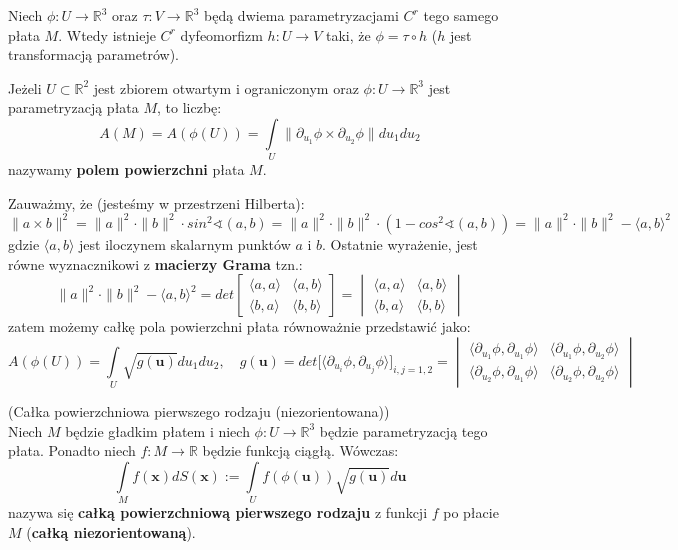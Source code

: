 \begin{tw}
	Niech $\phi:U\rightarrow\mathbb{R}^3$ oraz $\tau:V\rightarrow\mathbb{R}^3$ będą dwiema parametryzacjami $C^r$ tego samego płata $M$. Wtedy istnieje $C^r$ dyfeomorfizm $h:U\rightarrow V$ taki, że $\phi=\tau\circ h$ ($h$ jest transformacją parametrów).
\end{tw}

\begin{df}
	Jeżeli $U\subset\mathbb{R}^2$ jest zbiorem otwartym i ograniczonym oraz $\phi:U\rightarrow\mathbb{R}^3$ jest parametryzacją płata $M$, to liczbę: $$A(M)=A(\phi(U))=\int\limits_U\|\partial_{u_1}\phi\times\partial_{u_2}\phi\|du_1du_2$$ nazywamy \textbf{polem powierzchni} płata $M$.
\end{df}

\begin{uwg}
	Zauważmy, że (jesteśmy w przestrzeni Hilberta): $$\|a\times b\|^2=\|a\|^2\cdot\|b\|^2\cdot sin^2\sphericalangle(a,b)=\|a\|^2\cdot\|b\|^2\cdot(1-cos^2\sphericalangle(a,b))=\|a\|^2\cdot\|b\|^2-\langle a,b\rangle^2$$ gdzie $\langle a,b\rangle$ jest iloczynem skalarnym punktów $a$ i $b$. Ostatnie wyrażenie, jest równe wyznacznikowi z \textbf{macierzy Grama} tzn.: 
	$$\|a\|^2\cdot\|b\|^2-\langle a,b\rangle^2=det\begin{bmatrix}
	\langle a,a\rangle & \langle a,b\rangle \\
	\langle b,a\rangle & \langle b,b\rangle \end{bmatrix}=
	\begin{vmatrix}
	\langle a,a\rangle & \langle a,b\rangle \\
	\langle b,a\rangle & \langle b,b\rangle \end{vmatrix}$$
	zatem możemy całkę pola powierzchni płata równoważnie przedstawić jako:
	$$A(\phi(U))=\int\limits_U\sqrt{g(\textbf{u})}du_1du_2,\quad g(\textbf{u})=det\big[\langle\partial_{u_i}\phi,\partial_{u_j}\phi\rangle\big]_{i,j=1,2}=
	\begin{vmatrix}
	\langle\partial_{u_1}\phi,\partial_{u_1}\phi\rangle & \langle\partial_{u_1}\phi,\partial_{u_2}\phi\rangle \\
	\langle\partial_{u_2}\phi,\partial_{u_1}\phi\rangle & \langle\partial_{u_2}\phi,\partial_{u_2}\phi\rangle\end{vmatrix}$$
\end{uwg}

\begin{df}{(Całka powierzchniowa pierwszego rodzaju (niezorientowana))}\\
	Niech $M$ będzie gładkim płatem i niech $\phi:U\rightarrow\mathbb{R}^3$ będzie parametryzacją tego płata. Ponadto niech $f:M\rightarrow\mathbb{R}$ będzie funkcją ciągłą. Wówczas: $$\int\limits_Mf(\textbf{x})dS(\textbf{x}):=\int\limits_Uf(\phi(\textbf{u}))\sqrt{g(\textbf{u})}d\textbf{u}$$ nazywa się \textbf{całką powierzchniową pierwszego rodzaju} z funkcji $f$ po płacie $M$ (\textbf{całką niezorientowaną}).
\end{df}

